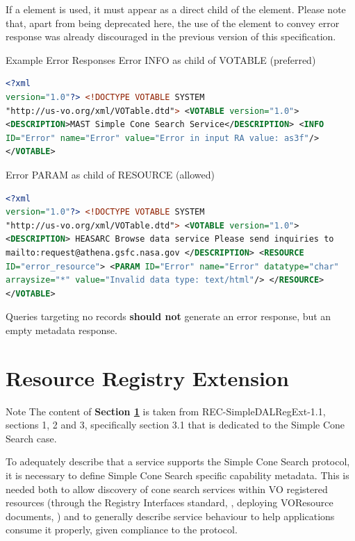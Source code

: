 \documentclass[11pt,a4paper]{ivoa} 
\begin{document}
If a  element is used, it must appear as a direct child of
the  element. Please note
that, apart from being deprecated here, the use of the 
element to convey error response was already discouraged in the previous
version of this specification.

\begin{bigdescription} \item[Example Error Responses] Error INFO as
child of VOTABLE (preferred)\\
\begin{lstlisting}[language=XML,basicstyle=\footnotesize] <?xml
version="1.0"?> <!DOCTYPE VOTABLE SYSTEM
"http://us-vo.org/xml/VOTable.dtd"> <VOTABLE version="1.0">
<DESCRIPTION>MAST Simple Cone Search Service</DESCRIPTION> <INFO
ID="Error" name="Error" value="Error in input RA value: as3f"/>
</VOTABLE> \end{lstlisting} Error PARAM as child of RESOURCE (allowed)
\begin{lstlisting}[language=XML,basicstyle=\footnotesize] <?xml
version="1.0"?> <!DOCTYPE VOTABLE SYSTEM
"http://us-vo.org/xml/VOTable.dtd"> <VOTABLE version="1.0">
<DESCRIPTION> HEASARC Browse data service Please send inquiries to
mailto:request@athena.gsfc.nasa.gov </DESCRIPTION> <RESOURCE
ID="error_resource"> <PARAM ID="Error" name="Error" datatype="char"
arraysize="*" value="Invalid data type: text/html"/> </RESOURCE>
</VOTABLE> \end{lstlisting} \end{bigdescription}

Queries targeting no records \textbf{should not} generate an error
response, but an empty metadata response.

\section{Resource Registry Extension} \label{sec:regext}

\begin{admonition}{Note} The content of \textbf{Section
\ref{sec:regext}} is taken from REC-SimpleDALRegExt-1.1, sections 1, 2
and 3, specifically section 3.1 that is dedicated to the Simple Cone
Search case.  \end{admonition}

To adequately describe that a service supports the Simple Cone Search
protocol, it is necessary to define Simple Cone Search specific
capability metadata. This is needed both to allow discovery of cone
search services within VO registered resources (through the Registry
Interfaces standard, \citet{std:RI1}, deploying VOResource documents,
\citet{std:VOR}) and to generally describe service behaviour to help
applications consume it properly, given compliance to the protocol.
\end{document}
